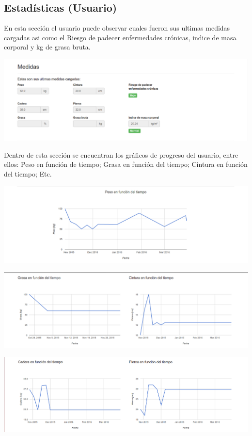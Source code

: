 \documentclass[runningheads,a4paper,spanish]{llncs}
\begin{document}
\subsection{Estadísticas (Usuario)}
En esta sección el usuario puede observar cuales fueron sus ultimas medidas cargadas asi como el Riesgo de padecer enfermedades crónicas, indice de masa corporal y kg de grasa bruta.
\begin{center}
	\includegraphics[scale=0.3]{ultimas_medidas.png}
\end{center}
Dentro de esta sección se encuentran los gráficos de progreso del usuario, entre ellos: Peso en función de tiempo; Grasa en función del tiempo; Cintura en función del tiempo; Etc.
\begin{center}
	\includegraphics[scale=0.3]{grafico1.png}
\end{center}
\begin{center}
	\includegraphics[scale=0.3]{grafico2.png}
\end{center}
\begin{center}
	\includegraphics[scale=0.3]{grafico3.png}
\end{center}
\end{document}
